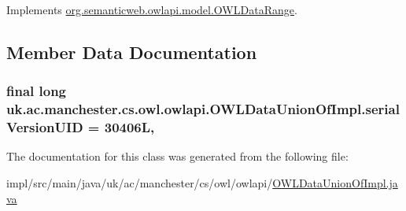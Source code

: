 Implements \hyperlink{interfaceorg_1_1semanticweb_1_1owlapi_1_1model_1_1_o_w_l_data_range_abaf13feb459a14cb55f9749191380b90}{org.\-semanticweb.\-owlapi.\-model.\-O\-W\-L\-Data\-Range}.



\subsection{Member Data Documentation}
\hypertarget{classuk_1_1ac_1_1manchester_1_1cs_1_1owl_1_1owlapi_1_1_o_w_l_data_union_of_impl_aa7ed249537efc37d795566dfa6f64ca5}{
\subsubsection[{serial\-Version\-U\-I\-D}]{\setlength{\rightskip}{0pt plus 5cm}final long uk.\-ac.\-manchester.\-cs.\-owl.\-owlapi.\-O\-W\-L\-Data\-Union\-Of\-Impl.\-serial\-Version\-U\-I\-D = 30406\-L\hspace{0.3cm}{\ttfamily [static]}, {\ttfamily [private]}}}\label{classuk_1_1ac_1_1manchester_1_1cs_1_1owl_1_1owlapi_1_1_o_w_l_data_union_of_impl_aa7ed249537efc37d795566dfa6f64ca5}


The documentation for this class was generated from the following file\-:\begin{DoxyCompactItemize}
\item 
impl/src/main/java/uk/ac/manchester/cs/owl/owlapi/\hyperlink{_o_w_l_data_union_of_impl_8java}{O\-W\-L\-Data\-Union\-Of\-Impl.\-java}\end{DoxyCompactItemize}
